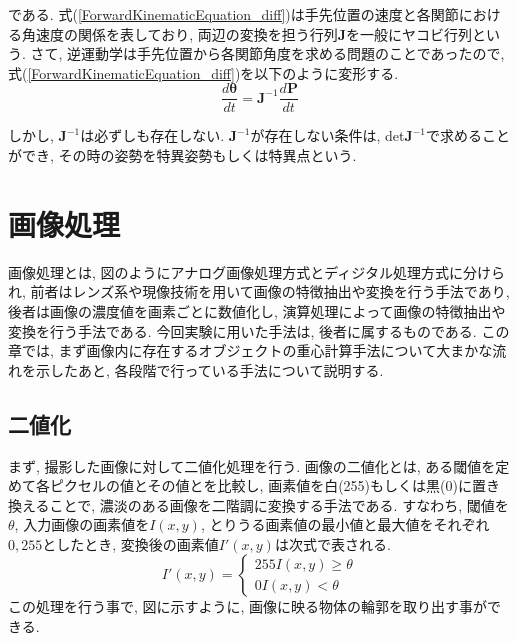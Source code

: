 \documentclass{suribt}
\begin{document}
である. 式(\ref{ForwardKinematicEquation_diff})は手先位置の速度と各関節における角速度の関係を表しており, 両辺の変換を担う行列${\bm J}$を一般にヤコビ行列という. 
さて, 逆運動学は手先位置から各関節角度を求める問題のことであったので, 式(\ref{ForwardKinematicEquation_diff})を以下のように変形する.
\begin{equation}
	\label{ForwardKinematicEquation_diff}
	\frac{d{\bm \theta}}{dt} = {\bm J}^{-1}\frac{d{\bm P}}{dt}
\end{equation}

しかし, ${\bm J^{-1}}$は必ずしも存在しない. ${\bm J^{-1}}$が存在しない条件は, det${\bm J^{-1}}$で求めることができ, その時の姿勢を特異姿勢もしくは特異点という. 

\chapter{画像処理}
画像処理とは, 図のようにアナログ画像処理方式とディジタル処理方式に分けられ, 前者はレンズ系や現像技術を用いて画像の特徴抽出や変換を行う手法であり, 後者は画像の濃度値を画素ごとに数値化し, 演算処理によって画像の特徴抽出や変換を行う手法である. 今回実験に用いた手法は, 後者に属するものである. この章では, まず画像内に存在するオブジェクトの重心計算手法について大まかな流れを示したあと, 各段階で行っている手法について説明する.
\section{二値化}
まず, 撮影した画像に対して二値化処理を行う. 
画像の二値化とは, ある閾値を定めて各ピクセルの値とその値とを比較し, 画素値を白(255)もしくは黒(0)に置き換えることで, 濃淡のある画像を二階調に変換する手法である. すなわち, 閾値を$\theta$, 入力画像の画素値を$I(x, y)$, とりうる画素値の最小値と最大値をそれぞれ$0, 255$としたとき, 変換後の画素値$I'(x, y)$は次式で表される. 
\begin{equation}
	I'(x, y) = \left \{
		\begin{array}{c}
			255  I(x, y) \geq \theta \\
			 0    I(x, y) < \theta
		\end{array}
	\right.
\end{equation}
この処理を行う事で, 図に示すように, 画像に映る物体の輪郭を取り出す事ができる.
\end{document}
